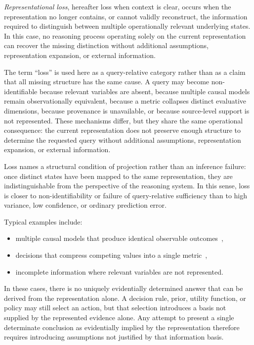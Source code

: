 \documentclass[11pt]{article}
\theoremstyle{definition}
\theoremstyle{remark}
\begin{document}
\emph{Representational loss}, hereafter loss when context is clear, occurs when the representation no longer contains, or cannot validly reconstruct, the information required to distinguish between multiple operationally relevant underlying states. In this case, no reasoning process operating solely on the current representation can recover the missing distinction without additional assumptions, representation expansion, or external information.

The term ``loss'' is used here as a query-relative category rather than as a claim that all missing structure has the same cause. A query may become non-identifiable because relevant variables are absent, because multiple causal models remain observationally equivalent, because a metric collapses distinct evaluative dimensions, because provenance is unavailable, or because source-level support is not represented. These mechanisms differ, but they share the same operational consequence: the current representation does not preserve enough structure to determine the requested query without additional assumptions, representation expansion, or external information.

Loss names a structural condition of projection rather than an inference failure: once distinct states have been mapped to the same representation, they are indistinguishable from the perspective of the reasoning system. In this sense, loss is closer to non-identifiability or failure of query-relative sufficiency than to high variance, low confidence, or ordinary prediction error.

Typical examples include:
\begin{itemize}[leftmargin=1.5em]
    \item multiple causal models that produce identical observable outcomes~\cite{Pearl2009},
    \item decisions that compress competing values into a single metric~\cite{Savage1954},
    \item incomplete information where relevant variables are not represented.
\end{itemize}

In these cases, there is no uniquely evidentially determined answer that can be derived from the representation alone. A decision rule, prior, utility function, or policy may still select an action, but that selection introduces a basis not supplied by the represented evidence alone. Any attempt to present a single determinate conclusion as evidentially implied by the representation therefore requires introducing assumptions not justified by that information basis.
\end{document}
